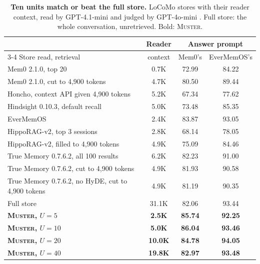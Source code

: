 \documentclass{article}
\newcommand{\ours}{\rowcolor{oursbg}}
\newcommand{\tabfont}{\fontsize{7.5}{8.5}\selectfont\renewcommand{\arraystretch}{1.0}}
\newcommand{\sys}{\textsc{Muster}}
\begin{document}
\begin{table}[H]
\centering\tabfont
\caption{\textbf{Ten units match or beat the full store.} LoCoMo \cite{locomo} stores with their reader context, read by GPT-4.1-mini \cite{gpt41} and judged by GPT-4o-mini \cite{gpt4omini}. Full store: the whole conversation, unretrieved. Bold: \sys{}.}
\label{tab:locomoall}
\begin{tabular}{lccc}
\toprule
 & Reader & \multicolumn{2}{c}{Answer prompt} \\
\cmidrule(lr){3-4}
Store read, retrieval & context & Mem0's & EverMemOS's \\
\midrule
Mem0 2.1.0, top 20 & 0.7K & 72.99 & 84.22 \\
Mem0 2.1.0, cut to 4{,}900 tokens & 4.7K & 80.50 & 89.44 \\
Honcho, context API given 4{,}900 tokens & 5.2K & 67.34 & 77.62 \\
Hindsight 0.10.3, default recall & 5.0K & 73.48 & 85.35 \\
EverMemOS & 2.4K & 83.87 & 93.05 \\
HippoRAG-v2, top 3 sessions & 2.8K & 68.14 & 78.05 \\
HippoRAG-v2, filled to 4{,}900 tokens & 4.9K & 75.09 & 84.46 \\
True Memory 0.7.6.2, all 100 results & 6.2K & 82.23 & 91.00 \\
True Memory 0.7.6.2, cut to 4{,}900 tokens & 4.9K & 81.93 & 90.58 \\
True Memory 0.7.6.2, no HyDE, cut to 4{,}900 tokens & 4.9K & 81.19 & 90.35 \\
Full store & 31.1K & 82.06 & 93.44 \\
\ours \textbf{\sys{}, $U{=}5$} & \textbf{2.5K} & \textbf{85.74} & \textbf{92.25} \\
\ours \textbf{\sys{}, $U{=}10$} & \textbf{5.0K} & \textbf{86.04} & \textbf{93.46} \\
\ours \textbf{\sys{}, $U{=}20$} & \textbf{10.0K} & \textbf{84.78} & \textbf{94.05} \\
\ours \textbf{\sys{}, $U{=}40$} & \textbf{19.8K} & \textbf{82.97} & \textbf{93.48} \\
\bottomrule
\end{tabular}
\end{table}
\end{document}

